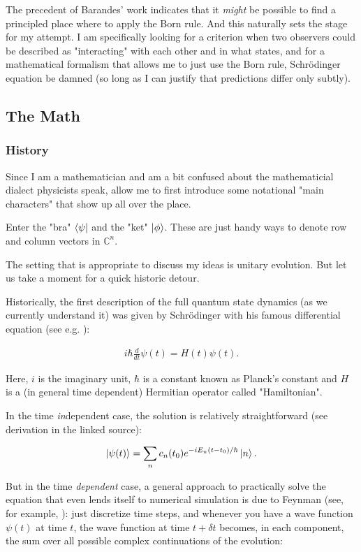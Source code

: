 \documentclass{article}
\begin{document}
The precedent of Barandes' work indicates that it \textit{might} be possible to find a principled place where to apply the Born rule. And this naturally sets the stage for my attempt. I am specifically looking for a criterion when two observers could be described as "interacting" with each other and in what states, and for a mathematical formalism that allows me to just use the Born rule, Schrödinger equation be damned (so long as I can justify that predictions differ only subtly).

\subsection{The Math}

\subsubsection{History}

Since I am a mathematician and am a bit confused about the mathematicial dialect physicists speak, allow me to first introduce some notational "main characters" that show up all over the place.

Enter the "bra" $\bra{\psi}$ and the "ket" $\ket{\phi}$. These are just handy ways to denote row and column vectors in $\mathbb{C}^n$.

The setting that is appropriate to discuss my ideas is unitary evolution. But let us take a moment for a quick historic detour.

Historically, the first description of the full quantum state dynamics (as we currently understand it) was given by Schrödinger with his famous differential equation (see e.g. \cite{Lecture25}):

\begin{align*}
i\hbar \frac{d}{d t}\psi(t) = H(t)\psi(t).
\end{align*}

Here, $i$ is the imaginary unit, $\hbar$ is a constant known as Planck's constant and $H$ is a (in general time dependent) Hermitian operator called "Hamiltonian".

In the time \textit{in}dependent case, the solution is relatively straightforward (see derivation in the linked source):

\begin{align*}
\ket{\psi(t)}=\sum_n c_n(t_0)e^{-iE_n(t-t_0)/\hbar}\ket{n}.
\end{align*}

But in the time \textit{dependent} case, a general approach to practically solve the equation that even lends itself to numerical simulation is due to Feynman (see, for example, \cite{Perepelitsa_PathIntegrals}): just discretize time steps, and whenever you have a wave function $\psi(t)$ at time $t$, the wave function at time $t+\delta t$ becomes, in each component, the sum over all possible complex continuations of the evolution:
\end{document}
